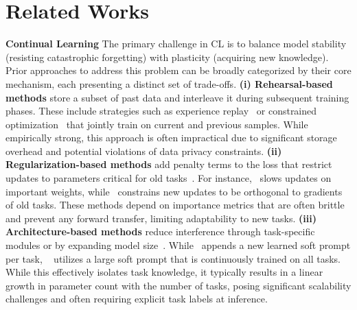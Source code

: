 \documentclass[11pt]{article}
\begin{document}
\section{Related Works}
\textbf{Continual Learning} \hspace{5pt}
The primary challenge in CL is to balance model stability (resisting catastrophic forgetting) with plasticity (acquiring new knowledge). Prior approaches to address this problem can be broadly categorized by their core mechanism, each presenting a distinct set of trade-offs.
\textbf{(i) Rehearsal-based methods} store a subset of past data and interleave it during subsequent training phases. These include strategies such as experience replay~\cite{riemer2018learning} or constrained optimization~\cite{aljundi2017expert, chaudhry2019continual, he2024seekr} that jointly train on current and previous samples. While empirically strong, this approach is often impractical due to significant storage overhead and potential violations of data privacy constraints.
\textbf{(ii) Regularization-based methods} add penalty terms to the loss that restrict updates to parameters critical for old tasks~\cite{du2024unlocking, li2017learning, de2019episodic}. For instance,~\cite{kirkpatrick2017overcoming} slows updates on important weights, while~\cite{farajtabar2020orthogonal} constrains new updates to be orthogonal to gradients of old tasks. These methods depend on importance metrics that are often brittle and prevent any forward transfer, limiting adaptability to new tasks.
\textbf{(iii) Architecture-based methods} reduce interference through task-specific modules or by expanding model size~\cite{li2019learn, wang2023rehearsal}. While~\cite{razdaibiedina2023progressive} appends a new learned soft prompt per task, ~\cite{qin2021lfpt5} utilizes a large
soft prompt that is continuously trained on all tasks. While this effectively isolates task knowledge, it typically results in a linear growth in parameter count with the number of tasks, posing significant scalability challenges and often requiring explicit task labels at inference.
\end{document}
